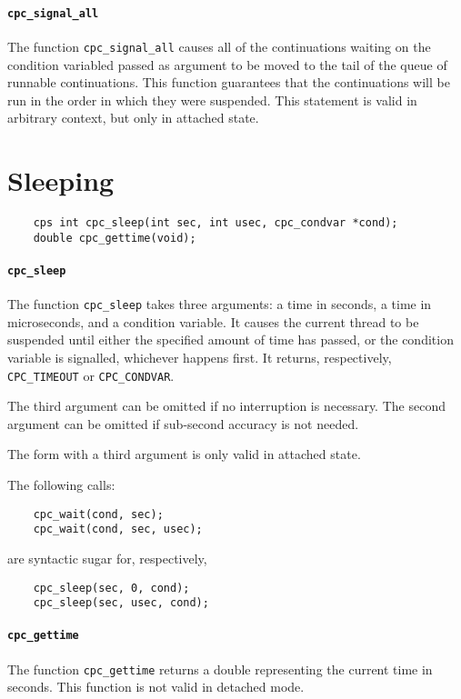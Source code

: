 \documentclass[a4paper]{report}
\begin{document}
\paragraph{\tt cpc\_signal\_all} The function {\tt cpc\_signal\_all}
causes all of the continuations waiting on the condition variabled passed
as argument to be moved to the tail of the queue of runnable continuations.
This function guarantees that the continuations will be run in the order in
which they were suspended.  This statement is valid in arbitrary context,
but only in attached state.

\section{Sleeping}

\begin{verbatim}
    cps int cpc_sleep(int sec, int usec, cpc_condvar *cond);
    double cpc_gettime(void);
\end{verbatim}

\paragraph{\tt cpc\_sleep} The function {\tt cpc\_sleep} takes three
arguments: a time in seconds, a time in microseconds, and a condition
variable.  It causes the current thread to be suspended until
either the specified amount of time has passed, or the condition
variable is signalled, whichever happens first.  It returns,
respectively, {\tt CPC\_TIMEOUT} or {\tt CPC\_CONDVAR}.

The third argument can be omitted if no interruption is necessary.
The second argument can be omitted if sub-second accuracy is not
needed.

The form with a third argument is only valid in attached state.

The following calls:
\begin{verbatim}
    cpc_wait(cond, sec);
    cpc_wait(cond, sec, usec);
\end{verbatim}
are syntactic sugar for, respectively,
\begin{verbatim}
    cpc_sleep(sec, 0, cond);
    cpc_sleep(sec, usec, cond);
\end{verbatim}

\paragraph{\tt cpc\_gettime} The function {\tt cpc\_gettime} returns a double
representing the current time in seconds.  This function is not valid in
detached mode.
\end{document}
